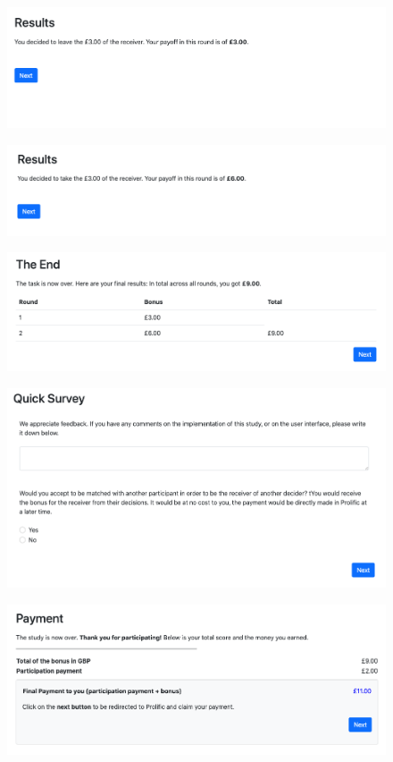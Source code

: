 \documentclass[11pt]{article}
\theoremstyle{plainCl1}
\begin{document}
\begin{figure}[h]
\centering
\includegraphics[scale=0.5]{results_high_take}
\end{figure}

\begin{figure}[h]
\centering
\includegraphics[scale=0.5]{results_high_leave}
\end{figure}

\begin{figure}[h]
\centering
\includegraphics[scale=0.5]{end}
\end{figure}

\begin{figure}[h]
\centering
\includegraphics[scale=0.5]{commentbox}
\end{figure}

\begin{figure}[h]
\centering
\includegraphics[scale=0.5]{payment}
\end{figure}
\end{document}

